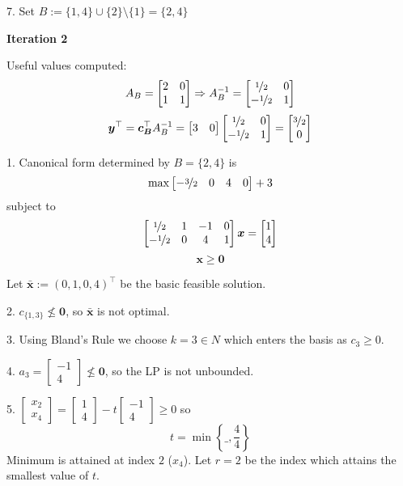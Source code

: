 7. Set $ B:=\{1,4\}\cup \{2\}\setminus\{1\}=\{2,4\} $

\textbf{Iteration 2}

Useful values computed:
\[ A_B=
\begin{bmatrix}
    2 & 0\\
    1 & 1\\
\end{bmatrix} \Rightarrow
A_B^{-1}=
\begin{bmatrix}
    \nicefrac{1}{2} & 0\\
    -\nicefrac{1}{2} & 1\\
\end{bmatrix} \]
\[ \bm{y}^\top=\bm{c_B}^\top A_B^{-1}=
\begin{bmatrix}
    3 & 0
\end{bmatrix}
\begin{bmatrix}
    \nicefrac{1}{2} & 0\\
    -\nicefrac{1}{2} & 1\\
\end{bmatrix}=
\begin{bmatrix}
    \nicefrac{3}{2} \\
    0
\end{bmatrix}\]

1. Canonical form determined by $ B=\{2,4\} $ is
\[ \max 
\begin{bmatrix}
    -\nicefrac{3}{2} & 0 & 4 & 0
\end{bmatrix} + 3\]
subject to
\[ 
\begin{bmatrix}
    \nicefrac{1}{2} & 1 & -1 & 0\\
    -\nicefrac{1}{2} & 0 & 4 & 1
\end{bmatrix}\bm{x}=
\begin{bmatrix}
    1\\
    4
\end{bmatrix}
\]
\[ \bm{x}\ge \bm{0} \]

Let $ \bm{\bar{x}}:=(0,1,0,4)^\top $ be the basic feasible solution.

2. $ c_{\{1,3\}} \nleq \bm{0} $, so $ \bm{\bar{x}} $ is not optimal.

3. Using Bland's Rule we choose $ k=3\in N $ which enters the basis
as $ c_3\ge 0 $.

4.
$ 
a_3= \begin{bmatrix}
    -1\\
    4
\end{bmatrix}\nleq \bm{0}
$,
so the LP is not unbounded.

5.
$
\begin{bmatrix}
    x_2\\
    x_4
\end{bmatrix}
=
\begin{bmatrix}
    1\\
    4
\end{bmatrix}-t
\begin{bmatrix}
    -1\\
    4
\end{bmatrix}\ge 0
$
so
\[ t=\min \left\{\_,\frac{4}{4} \right\} \]
Minimum is attained at index $ 2 $ ($ x_4 $). Let $ r=2 $ be the index which attains the smallest value of $ t $.

